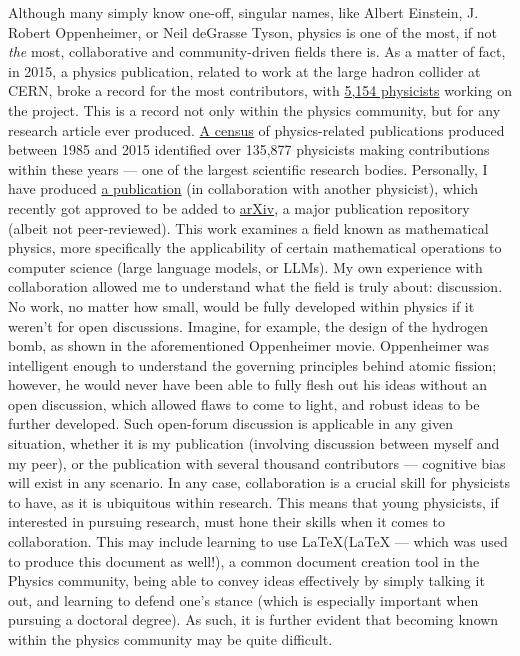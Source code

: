 \begin{justify}
  \hspace{.5in} Although many simply know one-off, singular names, like Albert Einstein, J. Robert Oppenheimer, or Neil deGrasse Tyson, physics is one of the most, if not \textit{the} most, collaborative and community-driven fields there is. As a matter of fact, in 2015, a physics publication, related to work at the large hadron collider at CERN, broke a record for the most contributors, with \href{https://www.nature.com/articles/nature.2015.17567}{5,154 physicists} working on the project. This is a record not only within the physics community, but for any research article ever produced. \href{https://arxiv.org/pdf/1901.02789}{A census} of physics-related publications produced between 1985 and 2015 identified over 135,877 physicists making contributions within these years — one of the largest scientific research bodies. Personally, I have produced \href{https://arxiv.org/abs/2405.01727}{a publication} (in collaboration with another physicist), which recently got approved to be added to \href{https://arxiv.org/}{arXiv}, a major publication repository (albeit not peer-reviewed). This work examines a field known as mathematical physics, more specifically the applicability of certain mathematical operations to computer science (large language models, or LLMs). My own experience with collaboration allowed me to understand what the field is truly about: discussion. No work, no matter how small, would be fully developed within physics if it weren't for open discussions. Imagine, for example, the design of the hydrogen bomb, as shown in the aforementioned Oppenheimer movie. Oppenheimer was intelligent enough to understand the governing principles behind atomic fission; however, he would never have been able to fully flesh out his ideas without an open discussion, which allowed flaws to come to light, and robust ideas to be further developed. Such open-forum discussion is applicable in any given situation, whether it is my publication (involving discussion between myself and my peer), or the publication with several thousand contributors — cognitive bias will exist in any scenario. In any case, collaboration is a crucial skill for physicists to have, as it is ubiquitous within research. This means that young physicists, if interested in pursuing research, must hone their skills when it comes to collaboration. This may include learning to use \LaTeX (LaTeX — which was used to produce this document as well!), a common document creation tool in the Physics community, being able to convey ideas effectively by simply talking it out, and learning to defend one's stance (which is especially important when pursuing a doctoral degree). As such, it is further evident that becoming known within the physics community may be quite difficult.


\end{justify}
